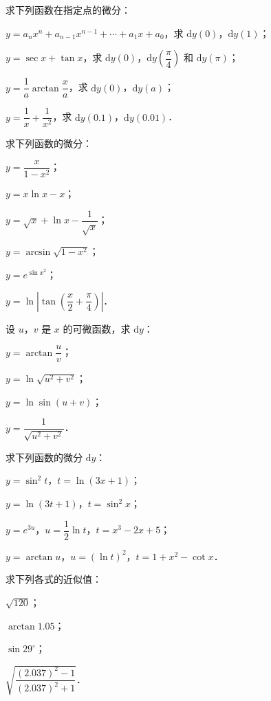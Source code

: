 \begin{xiti}
\item 求下列函数在指定点的微分：
\begin{ziti}
\item $y=a_n x^n + a_{n-1}x^{n-1} + \cdots + a_1 x + a_0$，求 $\mathrm{d}y(0)$，$\mathrm{d}y(1)$；
\item $y = \sec x + \tan x$，求 $\mathrm{d}y(0)$，$\mathrm{d}y\left(\dfrac{\pi}{4}\right)$ 和 $\mathrm{d}y(\pi)$；
\item $y = \dfrac{1}{a}\arctan\dfrac{x}{a}$，求 $\mathrm{d}y(0)$，$\mathrm{d}y(a)$；
\item $y = \dfrac{1}{x} + \dfrac{1}{x^2}$，求 $\mathrm{d}y(0.1)$，$\mathrm{d}y(0.01)$．
\end{ziti}

\item 求下列函数的微分：
\begin{ziti}
\item $y = \dfrac{x}{1-x^2}$；
\item $y = x\ln x - x$；
\item $y = \sqrt{x} + \ln x - \dfrac{1}{\sqrt{x}}$；
\item $y = \arcsin\sqrt{1-x^2}$；
\item $y = e^{\sin x^2}$；
\item $y = \ln\left|\tan\left(\dfrac{x}{2} + \dfrac{\pi}{4}\right)\right|$．
\end{ziti}

\item 设 $u$，$v$ 是 $x$ 的可微函数，求 $\mathrm{d}y$：
\begin{ziti}
\item $y = \arctan\dfrac{u}{v}$；
\item $y = \ln\sqrt{u^2 + v^2}$；
\item $y = \ln\sin(u + v)$；
\item $y = \dfrac{1}{\sqrt{u^2 + v^2}}$．
\end{ziti}

\item 求下列函数的微分 $\mathrm{d}y$：
\begin{ziti}
\item $y = \sin^2 t$，$t = \ln(3x + 1)$；
\item $y = \ln(3t + 1)$，$t = \sin^2 x$；
\item $y = e^{3u}$，$u = \dfrac{1}{2}\ln t$，$t = x^3 - 2x + 5$；
\item $y = \arctan u$，$u = (\ln t)^2$，$t = 1 + x^2 - \cot x$．
\end{ziti}

\item 求下列各式的近似值：
\begin{ziti}
\item $\sqrt{120}$；
\item $\arctan 1.05$；
\item $\sin 29^\circ$；
\item $\sqrt{\dfrac{(2.037)^2 - 1}{(2.037)^2 + 1}}$．
\end{ziti}
\end{xiti}
